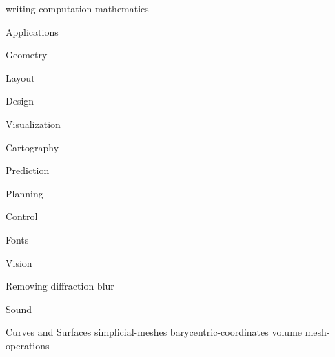 \def\sharedFolder{../shared/}
{writing}
{computation}
{mathematics}
\begin{plSection}{Applications}
\begin{plSection}{Geometry}
\end{plSection}%
\begin{plSection}{Layout}
\end{plSection}%
\begin{plSection}{Design}
\end{plSection}%
\begin{plSection}{Visualization}
\end{plSection}%
\begin{plSection}{Cartography}
\end{plSection}%
\begin{plSection}{Prediction}
\end{plSection}%
\begin{plSection}{Planning}
\end{plSection}%
\begin{plSection}{Control}
\end{plSection}%
\begin{plSection}{Fonts}
\end{plSection}%
\begin{plSection}{Vision}
\begin{plSection}{Removing diffraction blur}
\end{plSection}%
\end{plSection}%
\begin{plSection}{Sound}
\end{plSection}%
\begin{plSection}{Curves and Surfaces}
{simplicial-meshes}
{barycentric-coordinates}
{volume}
{mesh-operations}

\end{plSection}
\end{plSection}
